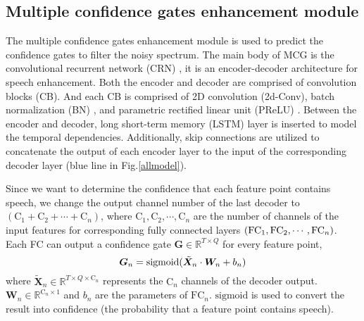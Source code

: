 \documentclass{article}
\begin{document}
	\subsection{Multiple confidence gates enhancement module}
	\label{sec:SPM}
	The multiple confidence gates enhancement module is used to predict the confidence gates to filter the noisy spectrum. The main body of MCG is the convolutional recurrent network (CRN) \cite{crn}, it is an encoder-decoder architecture for speech enhancement. Both the encoder and decoder are comprised of convolution blocks (CB). And each CB is comprised of 2D convolution (2d-Conv), batch normalization (BN) \cite{batchnorm}, and parametric rectified linear unit (PReLU) \cite{prelu}. Between the encoder and decoder, long short-term memory (LSTM) layer \cite{lstm} is inserted to model the temporal dependencies. Additionally, skip connections are utilized to concatenate the output of each encoder layer to the input of the corresponding decoder layer (blue line in Fig.\ref{allmodel}). 

	Since we want to determine the confidence that each feature point contains speech, we change the output channel number of the last decoder to $(\text{C}_1+\text{C}_2+\cdots +\text{C}_n)$, where $\text{C}_1, \text{C}_2, \cdots, \text{C}_n$ are the number of channels of the input features for corresponding fully connected layers $(\text{FC}_1,\text{FC}_2,\cdots,\\ \text{FC}_n)$. Each FC can output a confidence gate $\bm{G} \in \mathbb{R}^{T \times Q}$ for every feature point,
	\begin{equation}
		\label{confidence}
		\setlength{\abovedisplayskip}{3pt}
		\setlength{\belowdisplayskip}{3pt}
		\bm{G}_n = \text{sigmoid}(\tilde{\bm{X}}_n \cdot \bm{W}_n + b_n)
	\end{equation}
	where $\tilde{\bm{X}}_n \in \mathbb{R}^{T\times Q \times \text{C}_n}$ represents the $\text{C}_n$ channels of the decoder output. $\bm{W}_n \in \mathbb{R}^{\text{C}_n \times 1}$ and $b_n$ are the parameters of $\text{FC}_n$. $\text{sigmoid}$ \cite{sigmoid} is used to convert the result into confidence (the probability that a feature point contains speech).
	
\end{document}
